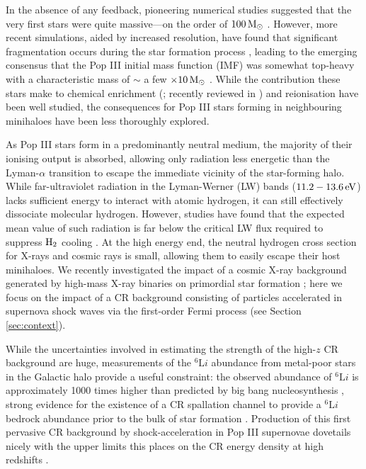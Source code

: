 \documentclass[../thesis.tex]{subfiles}
\begin{document}
In the absence of any feedback, pioneering numerical studies suggested that the very first stars were quite massive---on the order of $100\,\mathrm{M}_{\odot}$ \citep[e.g.,][]{BrommCoppiLarson1999,BrommCoppiLarson2002,AbelBryanNorman2002,Yoshidaetal2003,BrommLarson2004,Yoshidaetal2006,OSheaNorman2007}. 
However, more recent simulations, aided by increased resolution, have found that significant fragmentation occurs during the star formation process \citep{StacyGreifBromm2010,Clarketal2011a,Clarketal2011b,Greifetal2011,Greifetal2012,StacyBromm2013,Hiranoetal2014,Hosokawaetal2015}, leading to the emerging consensus that the Pop III initial mass function (IMF) was somewhat top-heavy with a characteristic mass of $\sim$ a few $\times 10\,\mathrm{M}_{\odot}$ \citep{Bromm2013}. 
While the contribution these stars make to chemical enrichment (\citealt{MadauFerraraRees2001,MoriFerraraMadau2002,BrommYoshidaHernquist2003,Hegeretal2003,UmedaNomoto2003,TornatoreFerraraSchneider2007,Greifetal2007,Greifetal2010,WiseAbel2008,Maioetal2011}; recently reviewed in \citealt{KarlssonBrommHawthorn2013}) and  reionisation \citep{Kitayamaetal2004,Sokasianetal2004,WhalenAbelNorman2004,AlvarezBrommShapiro2006,JohnsonGreifBromm2007,Robertsonetal2010} have been well studied, the consequences for Pop III stars forming in neighbouring minihaloes have been less thoroughly explored.  

As Pop III stars form in a predominantly neutral medium, the majority of their ionising output is absorbed, allowing only radiation less energetic than the Lyman-$\alpha$ transition to escape the immediate vicinity of the star-forming halo.  
While far-ultraviolet radiation in the Lyman-Werner (LW) bands ($11.2 - 13.6\,\mathrm{eV}$) lacks sufficient energy to interact with atomic hydrogen, it can still effectively dissociate molecular hydrogen.  
However, studies have found that the expected mean value of such radiation is far below the critical LW flux required to suppress $\mathrm{H}_2$ cooling \mbox{\citep{Dijkstraetal2008}}. 
At the high energy end, the neutral hydrogen cross section for X-rays and cosmic rays is small, allowing them to easily escape their host minihaloes. 
We recently investigated the impact of a cosmic X-ray background generated by high-mass X-ray binaries on primordial star formation \citep{Hummeletal2015}; here we focus on the impact of a CR background consisting of particles accelerated in supernova shock waves via the first-order Fermi process (see Section \ref{sec:context}).  

While the uncertainties involved in estimating the strength of the high-$z$  CR background are huge,  measurements of the $^6{\mathrm Li}$ abundance from metal-poor stars in the Galactic halo provide a useful constraint: the observed abundance of  $^6{\mathrm Li}$ is approximately 1000 times higher than predicted by big bang nucleosynthesis \citep{Asplundetal2006}, strong evidence for the existence of a CR spallation channel to provide a $^6{\mathrm Li}$ bedrock abundance prior to the bulk of star formation \citep{RollindeVangioniOlive2005,RollindeVangioniOlive2006}. 
Production of this first pervasive CR background by shock-acceleration in Pop III supernovae dovetails nicely with the upper limits this places on the CR energy density at high redshifts \citep{RollindeVangioniOlive2006}.
\end{document}
